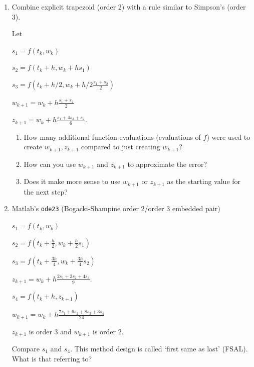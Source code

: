\documentclass[12pt,letterpaper,noanswers]{exam}
\begin{document}
\begin{enumerate}[resume]
\item Combine explicit trapezoid (order 2) with a rule similar to Simpson's (order 3).

Let

$s_1 = f(t_k,w_k)$

$s_2 = f(t_k + h, w_k + hs_1)$

$s_3 = f\left(t_k+ h/2, w_k + h/2\frac{s_1+s_2}{2}\right)$

$w_{k+1} = w_k + h\frac{s_1+s_2}{2}$

$z_{k+1} = w_k + h\frac{s_1+4s_3+s_2}{6}$.

\begin{enumerate}
\item How many additional function evaluations (evaluations of $f$) were used to create $w_{k+1}, z_{k+1}$ compared to just creating $w_{k+1}$?

\item How can you use $w_{k+1}$ and $z_{k+1}$ to approximate the error?

\item Does it make more sense to use $w_{k+1}$ or $z_{k+1}$ as the starting value for the next step?
\end{enumerate}
\item Matlab's \texttt{ode23} (Bogacki-Shampine order 2/order 3 embedded pair)

$s_1 = f(t_k,w_k)$

$s_2 = f(t_k + \frac{h}{2}, w_k + \frac{h}{2}s_1)$

$s_3 = f(t_k + \frac{3h}{4}, w_k + \frac{3h}{4}s_2)$

$z_{k+1} = w_k + h\frac{2s_1+3s_2+4s_3}{9}$.

$s_4 = f(t_k+ h, z_{k+1})$

$w_{k+1} = w_k + h\frac{7s_1+6s_2+8s_3+3s_4}{24}$

$z_{k+1}$ is order 3 and $w_{k+1}$ is order 2.

Compare $s_1$ and $s_4$.  This method design is called `first same as last' (FSAL).  What is that referring to?

\end{enumerate}
\end{document}
